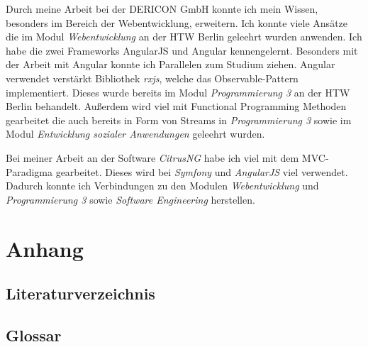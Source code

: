 \documentclass[chapterprefix=false, 12pt, a4paper, oneside, parskip=half, listof=totoc, bibliography=totoc, numbers=noendperiod]{scrbook}
\begin{document}
    Durch meine Arbeit bei der DERICON GmbH konnte ich mein Wissen, besonders im Bereich der Webentwicklung, erweitern.
    Ich konnte viele Ansätze die im Modul \textit{Webentwicklung} an der HTW  Berlin geleehrt wurden anwenden. Ich habe die zwei Frameworks
    AngularJS und Angular kennengelernt. Besonders mit der Arbeit mit Angular konnte ich Parallelen zum Studium ziehen. Angular
    verwendet verstärkt Bibliothek \textit{rxjs}, welche das Observable-Pattern implementiert. Dieses wurde bereits im Modul
    \textit{Programmierung 3} an der HTW Berlin behandelt. Außerdem wird viel mit Functional Programming Methoden gearbeitet die auch bereits in Form
    von Streams in \textit{Programmierung 3} sowie im Modul \textit{Entwicklung sozialer Anwendungen} geleehrt wurden.

    Bei meiner Arbeit an der Software \textit{CitrusNG} habe ich viel mit dem MVC-Paradigma gearbeitet. Dieses wird bei \textit{Symfony}
    und \textit{AngularJS} viel verwendet. Dadurch konnte ich Verbindungen zu den Modulen \textit{Webentwicklung} und \textit{Programmierung 3}
    sowie \textit{Software Engineering} herstellen.

    \chapter{Anhang}

    \section{Literaturverzeichnis}

    \printbibliography[heading=none]

    \section{Glossar}
\end{document}
